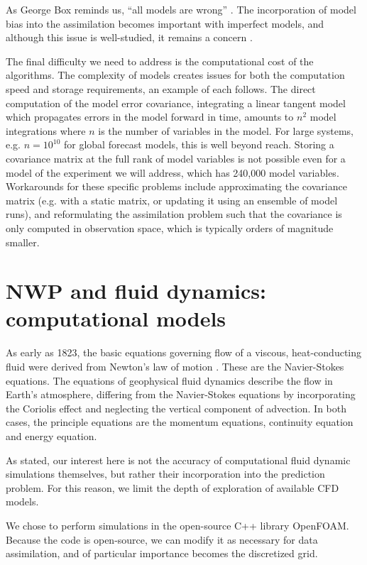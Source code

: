 \documentclass[12pt]{report}
\begin{document}
As George Box reminds us, ``all models are wrong'' . 
The incorporation of model bias into the assimilation becomes important with imperfect models, and although this issue is well-studied, it remains a concern .

The final difficulty we need to address is the computational cost of the algorithms.
The complexity of models creates issues for both the computation speed and storage requirements, an example of each follows.
The direct computation of the model error covariance, integrating a linear tangent model which propagates errors in the model forward in time, amounts to $n^2$ model integrations where $n$ is the number of variables in the model.
For large systems, e.g. $n = 10^{10}$ for global forecast models, this is well beyond reach.
Storing a covariance matrix at the full rank of model variables is not possible even for a model of the experiment we will address, which has 240,000 model variables.
Workarounds for these specific problems include approximating the covariance matrix (e.g. with a static matrix, or updating it using an ensemble of model runs), and reformulating the assimilation problem such that the covariance is only computed in observation space, which is typically orders of magnitude smaller.

\section{NWP and fluid dynamics: computational models}

As early as 1823, the basic equations governing flow of a viscous, heat-conducting fluid were derived from Newton's law of motion .
These are the Navier-Stokes equations.
The equations of geophysical fluid dynamics describe the flow in Earth's atmosphere, differing from the Navier-Stokes equations by incorporating the Coriolis effect and neglecting the vertical component of advection.
In both cases, the principle equations are the momentum equations, continuity equation and energy equation.

As stated, our interest here is not the accuracy of computational fluid dynamic simulations themselves, but rather their incorporation into the prediction problem.
For this reason, we limit the depth of exploration of available CFD models.

We chose to perform simulations in the open-source C++ library OpenFOAM.
Because the code is open-source, we can modify it as necessary for data assimilation, and of particular importance becomes the discretized grid.
\end{document}
